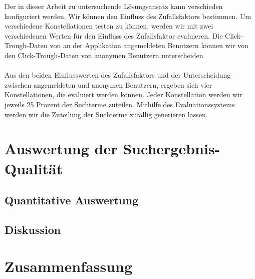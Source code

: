 Der in dieser Arbeit zu untersuchende Lösungsansatz kann verschieden konfiguriert werden. Wir können den Einfluss des Zufallsfaktors bestimmen. Um verschiedene Konstellationen testen zu können, werden wir mit zwei verschiedenen Werten für den Einfluss des Zufallsfaktor evaluieren. Die Click-Trough-Daten von an der Applikation angemeldeten Benutzern können wir von den Click-Trough-Daten von anonymen Benutzern unterscheiden.
\\
\\
Aus den beiden Einflusswerten des Zufallsfaktors und der Unterscheidung zwischen angemeldeten und anonymen Benutzern, ergeben sich vier Konstellationen, die evaluiert werden können. Jeder Konstellation werden wir jeweils 25 Prozent der Suchterme zuteilen. Mithilfe des Evaluationssystems werden wir die Zuteilung der Suchterme zufällig generieren lassen.

\section{Auswertung der Suchergebnis-Qualität}
\label{sec:Evaluation:Auswertung}

\subsection{Quantitative Auswertung}
\label{sec:Evaluation:Auswertung:QuantitativeAuswertung}

\subsection{Diskussion}
\label{sec:Evaluation:Auswertung:Diskussion}

\section{Zusammenfassung}
\label{sec:Evaluation:Zusammenfassung}